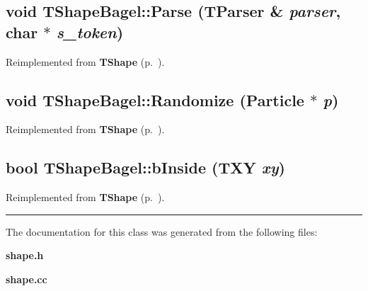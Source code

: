 \label{TShapeBagel_a1}
\subsection{\setlength{\rightskip}{0pt plus 5cm}void TShape\-Bagel::Parse ({\bf TParser} \& {\em parser}, char $\ast$ {\em s\_\-token})\hspace{0.3cm}{\tt  [virtual]}}



Reimplemented from {\bf TShape} {\rm (p.~\pageref{TShape_a0})}.\label{TShapeBagel_a2}
\subsection{\setlength{\rightskip}{0pt plus 5cm}void TShape\-Bagel::Randomize ({\bf Particle} $\ast$ {\em p})\hspace{0.3cm}{\tt  [virtual]}}



Reimplemented from {\bf TShape} {\rm (p.~\pageref{TShape_a1})}.\label{TShapeBagel_a3}
\subsection{\setlength{\rightskip}{0pt plus 5cm}bool TShape\-Bagel::b\-Inside ({\bf TXY} {\em xy})\hspace{0.3cm}{\tt  [virtual]}}



Reimplemented from {\bf TShape} {\rm (p.~\pageref{TShape_a2})}.\vspace{0.4cm}\hrule\vspace{0.2cm}
The documentation for this class was generated from the following files:\begin{CompactItemize}
\item 
{\bf shape.h}\item 
{\bf shape.cc}\end{CompactItemize}
